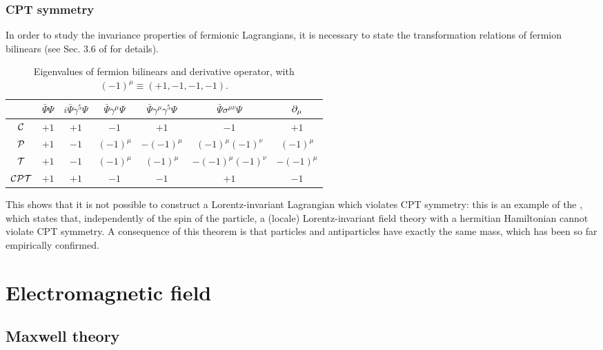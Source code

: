 \subsubsection{CPT symmetry}

In order to study the invariance properties of fermionic Lagrangians, it is necessary to state the transformation relations of fermion bilinears (see Sec. 3.6 of \cite{peskin} for details).

\begin{table}
  \centering
  \begin{tabular}{ccccccc}
    \hline
    \rule{0pt}{2.5ex} & $ \bar{\Psi} \Psi $ & $ i \bar{\Psi} \gamma^5 \Psi $ & $ \bar{\Psi} \gamma^\mu \Psi $ & $ \bar{\Psi} \gamma^\mu \gamma^5 \Psi $ & $ \bar{\Psi} \sigma^{\mu \nu} \Psi $ & $ \partial_\mu $ \\
    \hline
    \rule{0pt}{2.5ex} $ \mathcal{C} $ & $ +1 $ & $ +1 $ & $ -1 $ & $ +1 $ & $ -1 $ & $ +1 $ \\
    \rule{0pt}{2.5ex} $ \mathcal{P} $ & $ +1 $ & $ -1 $ & $ (-1)^\mu $ & $ - (-1)^\mu $ & $ (-1)^\mu (-1)^\nu $ & $ (-1)^\mu $ \\
    \rule{0pt}{2.5ex} $ \mathcal{T} $ & $ +1 $ & $ -1 $ & $ (-1)^\mu $ & $ (-1)^\mu $ & $ - (-1)^\mu (-1)^\nu $ & $ - (-1)^\mu $ \\
    \rule{0pt}{2.5ex} $ \mathcal{C}\mathcal{P}\mathcal{T} $ & $ +1 $ & $ +1 $ & $ -1 $ & $ -1 $ & $ +1 $ & $ -1 $
  \end{tabular}
  \caption{Eigenvalues of fermion bilinears and derivative operator, with $ (-1)^\mu \equiv (+1,-1,-1,-1) $.}
  \label{tab:ferm-bil-eigen}
\end{table}

This shows that it is not possible to construct a Lorentz-invariant Lagrangian which violates CPT symmetry: this is an example of the , which states that, independently of the spin of the particle, a (locale) Lorentz-invariant field theory with a hermitian Hamiltonian cannot violate CPT symmetry.
A consequence of this theorem is that particles and antiparticles have exactly the same mass, which has been so far empirically confirmed.

\section{Electromagnetic field}
\label{sec:qed}

\subsection{Maxwell theory}

